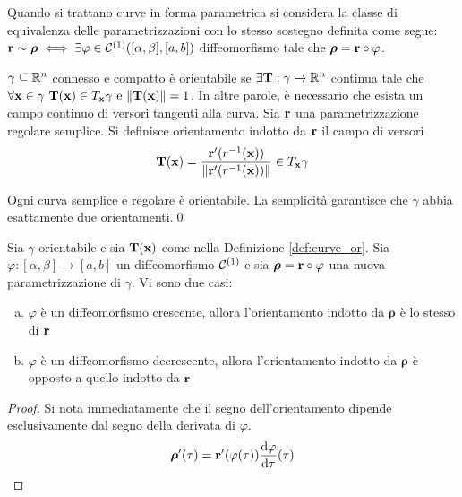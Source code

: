 \begin{remark}
	Quando si trattano curve in forma parametrica si considera la classe di equivalenza delle parametrizzazioni con lo stesso sostegno definita come segue: $\vb{r}\sim\bm\rho \iff \exists \varphi \in \mathcal{C}^{(1)}([\alpha,\beta],[a,b])$ diffeomorfismo tale che $\bm\rho=\vb{r}\circ\varphi$.
\end{remark}

\begin{definition}
	\label{def:curve_or}
	$\gamma \subseteq \mathbb{R}^n$ connesso e compatto è orientabile se $\exists \vb{T}: \gamma \to \mathbb{R}^n$ continua tale che $\forall \vb{x} \in \gamma \ \vb{T}(\vb{x})\in T_{\vb{x}}\gamma \text{ e } \norm{\vb{T}(\vb{x})}=1$. In altre parole, è necessario che esista un campo continuo di versori tangenti alla curva. Sia $\vb{r}$ una parametrizzazione regolare semplice. Si definisce orientamento indotto da $\vb{r}$ il campo di versori
	$$
		\vb{T}(\vb{x})=\frac{\vb{r}'(r^{-1}(\vb{x}))}{\norm{\vb{r}'(r^{-1}(\vb{x}))}} \in T_{\vb{x}}\gamma
	$$
\end{definition}

\begin{lemma}
	Ogni curva semplice e regolare è orientabile. La semplicità garantisce che $\gamma$ abbia esattamente due orientamenti.\qed
\end{lemma}

\begin{theorem}
	Sia $\gamma$ orientabile e sia $\vb{T}(\vb{x})$ come nella Definizione \ref{def:curve_or}. Sia $\varphi:[\alpha,\beta]\to[a,b]$ un diffeomorfismo $\mathcal{C}^{(1)}$ e sia $\bm\rho=\vb{r}\circ\varphi$ una nuova parametrizzazione di $\gamma$. Vi sono due casi:
	\begin{enumerate}[a.]
		\item $\varphi$ è un diffeomorfismo crescente, allora l'orientamento indotto da $\bm\rho$ è lo stesso di $\vb{r}$
		\item $\varphi$ è un diffeomorfismo decrescente, allora l'orientamento indotto da $\bm\rho$ è opposto a quello indotto da $\vb{r}$
	\end{enumerate}
\end{theorem}

\begin{proof} Si nota immediatamente che il segno dell'orientamento dipende esclusivamente dal segno della derivata di $\varphi$.
	$$
		\bm\rho'(\tau)=\vb{r}'(\varphi(\tau))\frac{\dd \varphi}{\dd \tau}(\tau)
	$$
\end{proof}

